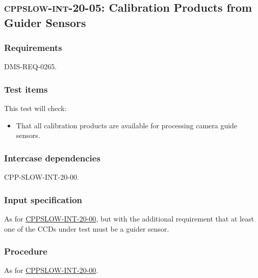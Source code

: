 \subsection{\textsc{cppslow-int-20-05}: Calibration Products from Guider Sensors}
\label{cppslow-int-20-05}

\subsubsection{Requirements}

DMS-REQ-0265.

\subsubsection{Test items}

This test will check:

\begin{itemize}

  \item{That all calibration products are available for processing camera
  guide sensors.}

\end{itemize}

\subsubsection{Intercase dependencies}

CPP-SLOW-INT-20-00.

\subsubsection{Input specification}

As for \hyperref[cppslow-int-20-00]{CPPSLOW-INT-20-00}, but with the
additional requirement that at least one of the CCDs under test must be a
guider sensor.

\subsubsection{Procedure}

As for \hyperref[cppslow-int-20-00]{CPPSLOW-INT-20-00}.
